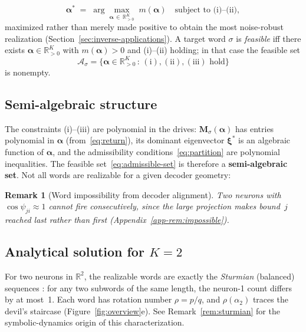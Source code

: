 \documentclass[12pt]{article}
\newcommand{\vv}[1]{\mathbf{#1}}
\newcommand{\xxi}{\boldsymbol{\xi}}
\newcommand{\RR}{\mathbb{R}}
\newtheorem{remark}{Remark}
\begin{document}
\begin{equation}\label{eq:invopt}
    \;\boldsymbol{\alpha}^*\;=\;\arg\max_{\boldsymbol{\alpha}\,\in\,\RR_{>0}^K}\;m(\boldsymbol{\alpha})\quad\text{subject to (i)--(ii)},\;
\end{equation}
maximized rather than merely made positive to obtain the most noise-robust realization (Section~\ref{sec:inverse-applications}). A target word $\sigma$ is \emph{feasible} iff there exists $\boldsymbol{\alpha}\in\RR_{>0}^K$ with $m(\boldsymbol{\alpha})>0$ and (i)--(ii) holding; in that case the feasible set
\begin{equation}\label{eq:admissible-set}
    \mathcal{A}_\sigma = \bigl\{\boldsymbol{\alpha}\in\RR_{>0}^K\,:\,(\text{i}),(\text{ii}),(\text{iii})\text{ hold}\bigr\}
\end{equation}
is nonempty.

\subsection{Semi-algebraic structure}

The constraints (i)--(iii) are polynomial in the drives: $\vv{M}_\sigma(\boldsymbol{\alpha})$ has entries polynomial in $\boldsymbol{\alpha}$ (from~\eqref{eq:return}), its dominant eigenvector $\xxi^*$ is an algebraic function of $\boldsymbol{\alpha}$, and the admissibility conditions~\eqref{eq:partition} are polynomial inequalities. The feasible set~\eqref{eq:admissible-set} is therefore a \textbf{semi-algebraic set}. Not all words are realizable for a given decoder geometry:

\begin{remark}[Word impossibility from decoder alignment]\label{rem:impossible} Two neurons with $\cos\psi_{ji}\approx 1$ cannot fire consecutively, since the large projection makes bound~$j$ reached last rather than first (Appendix~\ref{app-rem:impossible}). \end{remark}


\subsection{Analytical solution for $K=2$}

For two neurons in $\RR^2$, the realizable words are exactly the \emph{Sturmian} (balanced) sequences \citep{lothaire2002algebraic}: for any two subwords of the same length, the neuron-1 count differs by at most~1. Each word has rotation number $\rho=p/q$, and $\rho(\alpha_2)$ traces the devil's staircase (Figure~\ref{fig:overview}e). See Remark~\ref{rem:sturmian} for the symbolic-dynamics origin of this characterization.
\end{document}
